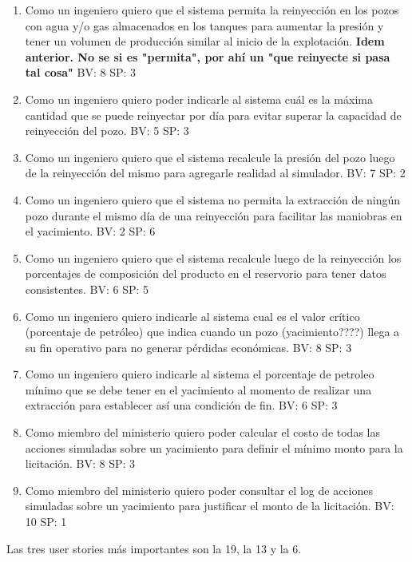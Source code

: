 \begin{enumerate}
  \item Como un ingeniero quiero que el sistema permita la reinyección en los pozos con agua y/o gas almacenados en los tanques para aumentar la presión y tener un volumen de producción similar al inicio de la explotación. \textbf{Idem anterior. No se si es "permita", por ahí un "que reinyecte si pasa tal cosa"} BV: 8 SP: 3 
  \item Como un ingeniero quiero poder indicarle al sistema cuál es la máxima cantidad que se puede reinyectar por día para evitar superar la capacidad de reinyección del pozo. BV: 5 SP: 3 
  \item Como un ingeniero quiero que el sistema recalcule la presión del pozo luego de la reinyección del mismo para agregarle realidad al simulador. BV: 7 SP: 2
  \item Como un ingeniero quiero que el sistema no permita la extracción de ningún pozo durante el mismo día de una reinyección para facilitar las maniobras en el yacimiento. BV: 2 SP: 6 
  \item Como un ingeniero quiero que el sistema recalcule luego de la reinyección los porcentajes de composición del producto en el reservorio para tener datos consistentes. BV: 6 SP: 5 
  \item Como un ingeniero quiero indicarle al sistema cual es el valor crítico (porcentaje de petróleo) que indica cuando un pozo (yacimiento????) llega a su fin operativo para no generar pérdidas económicas. BV: 8 SP: 3
  \item Como un ingeniero quiero indicarle al sistema el porcentaje de petroleo mínimo que se debe tener en el yacimiento al momento de realizar una extracción para establecer así una condición de fin. BV: 6 SP: 3 
  \item Como miembro del ministerio quiero poder calcular el costo de todas las acciones simuladas sobre un yacimiento para definir el mínimo monto para la licitación. BV: 8 SP: 3 
  \item Como miembro del ministerio quiero poder consultar el log de acciones simuladas sobre un yacimiento para justificar el monto de la licitación. BV: 10 SP: 1 
\end{enumerate}

Las tres user stories m\'as importantes son la 19, la 13 y la 6.

